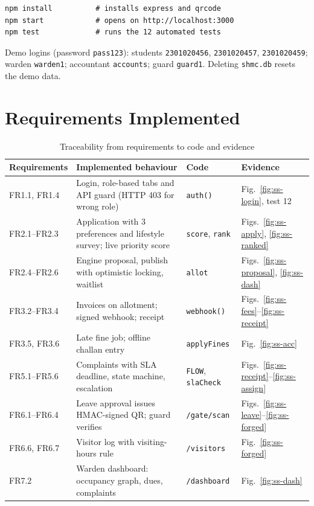 \documentclass[11pt,a4paper]{report}
\begin{document}
\begin{lstlisting}
npm install          # installs express and qrcode
npm start            # opens on http://localhost:3000
npm test             # runs the 12 automated tests
\end{lstlisting}
Demo logins (password \texttt{pass123}): students \texttt{2301020456}, \texttt{2301020457}, \texttt{2301020459}; warden \texttt{warden1}; accountant \texttt{accounts}; guard \texttt{guard1}. Deleting \texttt{shmc.db} resets the demo data.

\section{Requirements Implemented}
\begin{table}[H]
\centering\small
\caption{Traceability from requirements to code and evidence}\label{tab:trace}
\begin{tabularx}{\textwidth}{lLll}
\toprule
\textbf{Requirements} & \textbf{Implemented behaviour} & \textbf{Code} & \textbf{Evidence}\\
\midrule
FR1.1, FR1.4 & Login, role-based tabs and API guard (HTTP 403 for wrong role) & \texttt{auth()} & Fig.~\ref{fig:ss-login}, test 12\\
FR2.1--FR2.3 & Application with 3 preferences and lifestyle survey; live priority score & \texttt{score}, \texttt{rank} & Figs.~\ref{fig:ss-apply}, \ref{fig:ss-ranked}\\
FR2.4--FR2.6 & Engine proposal, publish with optimistic locking, waitlist & \texttt{allot} & Figs.~\ref{fig:ss-proposal}, \ref{fig:ss-dash}\\
FR3.2--FR3.4 & Invoices on allotment; signed webhook; receipt & \texttt{webhook()} & Figs.~\ref{fig:ss-fees}--\ref{fig:ss-receipt}\\
FR3.5, FR3.6 & Late fine job; offline challan entry & \texttt{applyFines} & Fig.~\ref{fig:ss-acc}\\
FR5.1--FR5.6 & Complaints with SLA deadline, state machine, escalation & \texttt{FLOW}, \texttt{slaCheck} & Figs.~\ref{fig:ss-receipt}--\ref{fig:ss-assign}\\
FR6.1--FR6.4 & Leave approval issues HMAC-signed QR; guard verifies & \texttt{/gate/scan} & Figs.~\ref{fig:ss-leave}--\ref{fig:ss-forged}\\
FR6.6, FR6.7 & Visitor log with visiting-hours rule & \texttt{/visitors} & Fig.~\ref{fig:ss-forged}\\
FR7.2 & Warden dashboard: occupancy graph, dues, complaints & \texttt{/dashboard} & Fig.~\ref{fig:ss-dash}\\
\bottomrule
\end{tabularx}
\end{table}
\end{document}
